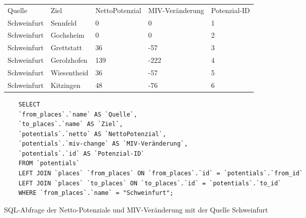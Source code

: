 \begin{tabularx}{\textwidth}{*5{X}}
Quelle & Ziel & NettoPotenzial & MIV-Veränderung & Potenzial-ID\\
Schweinfurt & Sennfeld & 0 & 0 & 1\\ 
Schweinfurt & Gochsheim & 0 & 0 & 2\\ 
Schweinfurt & Grettstatt & 36 & -57 & 3\\ 
Schweinfurt & Gerolzhofen & 139 & -222 & 4\\ 
Schweinfurt & Wiesentheid & 36 & -57 & 5\\ 
Schweinfurt & Kitzingen & 48 & -76 & 6\\ 
\end{tabularx}

\begin{listing}[htbp]
    \begin{verbatim}
    SELECT
    `from_places`.`name` AS `Quelle`, 
    `to_places`.`name` AS `Ziel`, 
    `potentials`.`netto` AS `NettoPotenzial`, 
    `potentials`.`miv-change` AS `MIV-Veränderung`, 
    `potentials`.`id` AS `Potenzial-ID`
    FROM `potentials`
    LEFT JOIN `places` `from_places` ON `from_places`.`id` = `potentials`.`from_id`
    LEFT JOIN `places` `to_places` ON `to_places`.`id` = `potentials`.`to_id`
    WHERE `from_places`.`name` = "Schweinfurt";
    \end{verbatim}
    \caption{SQL-Abfrage der Netto-Potenziale und MIV-Veränderung mit der Quelle Schweinfurt}\label{lst-fz-schweinfurt}
\end{listing}